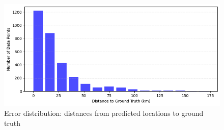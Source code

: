 \begin{figure}
    \centering
    \includegraphics[width=\textwidth]{./figs/barchart.png}
    \caption{Error distribution: distances from predicted locations to ground truth}
    \label{fig:error-distribution}
\end{figure}


